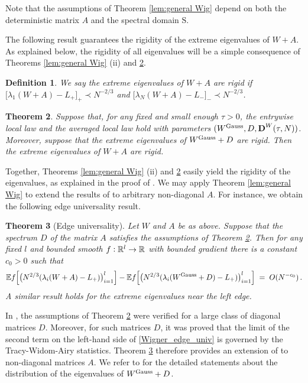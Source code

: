\documentclass[11pt]{article} %
\numberwithin{equation}{section}
\numberwithin{figure}{section}
\theoremstyle{plain} %
\newtheorem{theorem}{Theorem}[section]
\newtheorem{definition}[theorem]{Definition}
\theoremstyle{definition} %
\newcommand{\f}[1]{\boldsymbol{\mathrm{#1}}} %
\newcommand{\txt}[1]{\text{\rm{#1}}}
\newcommand{\E}{\mathbb{E}}
\newcommand{\R}{\mathbb{R}}
\newcommand{\col}{\mathrel{\vcenter{\baselineskip0.75ex \lineskiplimit0pt \hbox{.}\hbox{.}}}}
\newcommand{\pb}[1]{\bigl({#1}\bigr)}
\newcommand{\qb}[1]{\bigl[{#1}\bigr]}
\newcommand{\qB}[1]{\Bigl[{#1}\Bigr]}
\begin{document}
Note that the assumptions of Theorem \ref{lem:general Wig} depend on both the deterministic matrix $A$ and the spectral domain $\f S$.

The following result guarantees the rigidity of the extreme eigenvalues of $W+A$. As explained below, the rigidity of all eigenvalues will be a simple consequence of Theorems \ref{lem:general Wig} (ii) and \ref{thm:wigner_rig}.

\begin{definition}
We say the \emph{extreme eigenvalues of $W+A$ are rigid} if
$\qb{\lambda_1(W+A)-L_+}_+ \prec N^{-2/3}$ and $\qb{\lambda_N(W+A)-L_-}_- \prec N^{-2/3}$.
\end{definition}
\begin{theorem} \label{thm:wigner_rig}
Suppose that, for any fixed and small enough $\tau > 0$, the entrywise local law and the averaged local law hold with parameters $(W^{\txt{Gauss}}, D, \f D^W(\tau,N) )$. Moreover, suppose that the extreme eigenvalues of $W^{\txt{Gauss}} + D$ are rigid. Then the extreme eigenvalues of $W+A$ are rigid.
\end{theorem}

Together, Theorems \ref{lem:general Wig} (ii) and \ref{thm:wigner_rig} easily yield the rigidity of the eigenvalues, as explained in the proof of \cite[Theorem 2.2]{EYY3}. We may apply Theorem \ref{lem:general Wig} to extend the results of \cite{LSY} to arbitrary non-diagonal $A$. For instance, we obtain the following edge universality result.


\begin{theorem}[Edge universality] \label{lem:comp Wig}
Let $W$ and $A$ be as above. Suppose that the spectrum $D$ of the matrix $A$ satisfies the assumptions of Theorem \ref{thm:wigner_rig}. Then for any fixed $l$ and bounded smooth $f \col \R^l \to \R$ with bounded gradient there is a constant $c_0 > 0$ such that
\begin{equation} \label{Wigner_edge_univ}
\E f\qB{\pb{N^{2/3}(\lambda_i(W+A)-L_+)}_{i=1}^l} - \E f\qB{\pb{N^{2/3}(\lambda_i(W^{\txt{Gauss}} +D)-L_+)}_{i=1}^l} \;=\; O(N^{-c_0})\,.
\end{equation}
A similar result holds for the extreme eigenvalues near the left edge.
\end{theorem}

In \cite{LSY}, the assumptions of Theorem \ref{thm:wigner_rig} were verified for a large class of diagonal matrices $D$. Moreover, for such matrices $D$, it was proved that the limit of the second term on the left-hand side of \eqref{Wigner_edge_univ} is governed by the Tracy-Widom-Airy statistics. Theorem \ref{lem:comp Wig} therefore provides an extension of \cite[Theorem 2.8]{LSY} to non-diagonal matrices $A$. We refer to \cite{LSY} for the detailed statements about the distribution of the eigenvalues of $W^{\txt{Gauss}} +D$.
\end{document}
